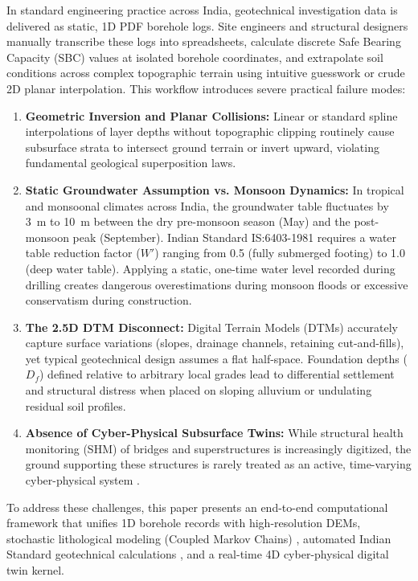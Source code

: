 \documentclass[11pt,a4paper]{article}
\begin{document}
In standard engineering practice across India, geotechnical investigation data is delivered as static, 1D PDF borehole logs. Site engineers and structural designers manually transcribe these logs into spreadsheets, calculate discrete Safe Bearing Capacity (SBC) values at isolated borehole coordinates, and extrapolate soil conditions across complex topographic terrain using intuitive guesswork or crude 2D planar interpolation. This workflow introduces severe practical failure modes:
\begin{enumerate}
    \item \textbf{Geometric Inversion and Planar Collisions:} Linear or standard spline interpolations of layer depths without topographic clipping routinely cause subsurface strata to intersect ground terrain or invert upward, violating fundamental geological superposition laws.
    \item \textbf{Static Groundwater Assumption vs. Monsoon Dynamics:} In tropical and monsoonal climates across India, the groundwater table fluctuates by 3~m to 10~m between the dry pre-monsoon season (May) and the post-monsoon peak (September). Indian Standard IS:6403-1981 \cite{is6403} requires a water table reduction factor ($W'$) ranging from 0.5 (fully submerged footing) to 1.0 (deep water table). Applying a static, one-time water level recorded during drilling creates dangerous overestimations during monsoon floods or excessive conservatism during construction.
    \item \textbf{The 2.5D DTM Disconnect:} Digital Terrain Models (DTMs) accurately capture surface variations (slopes, drainage channels, retaining cut-and-fills), yet typical geotechnical design assumes a flat half-space. Foundation depths ($D_f$) defined relative to arbitrary local grades lead to differential settlement and structural distress when placed on sloping alluvium or undulating residual soil profiles.
    \item \textbf{Absence of Cyber-Physical Subsurface Twins:} While structural health monitoring (SHM) of bridges and superstructures is increasingly digitized, the ground supporting these structures is rarely treated as an active, time-varying cyber-physical system \cite{tao2019digital}.
\end{enumerate}

To address these challenges, this paper presents an end-to-end computational framework that unifies 1D borehole records with high-resolution DEMs, stochastic lithological modeling (Coupled Markov Chains) \cite{elfeki2001modelling}, automated Indian Standard geotechnical calculations \cite{is6403,is2131,is1498}, and a real-time 4D cyber-physical digital twin kernel. 
\end{document}
